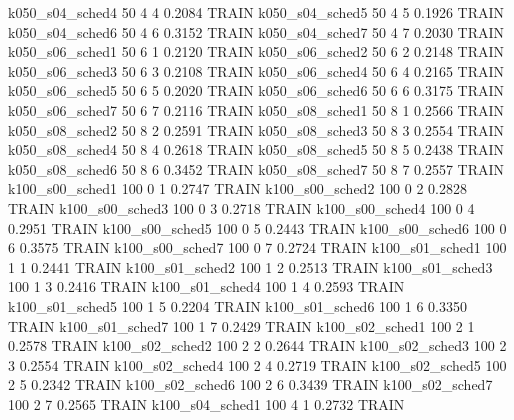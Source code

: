   k050_s04_sched4                   50    4   4    0.2084  TRAIN
  k050_s04_sched5                   50    4   5    0.1926  TRAIN
  k050_s04_sched6                   50    4   6    0.3152  TRAIN
  k050_s04_sched7                   50    4   7    0.2030  TRAIN
  k050_s06_sched1                   50    6   1    0.2120  TRAIN
  k050_s06_sched2                   50    6   2    0.2148  TRAIN
  k050_s06_sched3                   50    6   3    0.2108  TRAIN
  k050_s06_sched4                   50    6   4    0.2165  TRAIN
  k050_s06_sched5                   50    6   5    0.2020  TRAIN
  k050_s06_sched6                   50    6   6    0.3175  TRAIN
  k050_s06_sched7                   50    6   7    0.2116  TRAIN
  k050_s08_sched1                   50    8   1    0.2566  TRAIN
  k050_s08_sched2                   50    8   2    0.2591  TRAIN
  k050_s08_sched3                   50    8   3    0.2554  TRAIN
  k050_s08_sched4                   50    8   4    0.2618  TRAIN
  k050_s08_sched5                   50    8   5    0.2438  TRAIN
  k050_s08_sched6                   50    8   6    0.3452  TRAIN
  k050_s08_sched7                   50    8   7    0.2557  TRAIN
  k100_s00_sched1                  100    0   1    0.2747  TRAIN
  k100_s00_sched2                  100    0   2    0.2828  TRAIN
  k100_s00_sched3                  100    0   3    0.2718  TRAIN
  k100_s00_sched4                  100    0   4    0.2951  TRAIN
  k100_s00_sched5                  100    0   5    0.2443  TRAIN
  k100_s00_sched6                  100    0   6    0.3575  TRAIN
  k100_s00_sched7                  100    0   7    0.2724  TRAIN
  k100_s01_sched1                  100    1   1    0.2441  TRAIN
  k100_s01_sched2                  100    1   2    0.2513  TRAIN
  k100_s01_sched3                  100    1   3    0.2416  TRAIN
  k100_s01_sched4                  100    1   4    0.2593  TRAIN
  k100_s01_sched5                  100    1   5    0.2204  TRAIN
  k100_s01_sched6                  100    1   6    0.3350  TRAIN
  k100_s01_sched7                  100    1   7    0.2429  TRAIN
  k100_s02_sched1                  100    2   1    0.2578  TRAIN
  k100_s02_sched2                  100    2   2    0.2644  TRAIN
  k100_s02_sched3                  100    2   3    0.2554  TRAIN
  k100_s02_sched4                  100    2   4    0.2719  TRAIN
  k100_s02_sched5                  100    2   5    0.2342  TRAIN
  k100_s02_sched6                  100    2   6    0.3439  TRAIN
  k100_s02_sched7                  100    2   7    0.2565  TRAIN
  k100_s04_sched1                  100    4   1    0.2732  TRAIN

